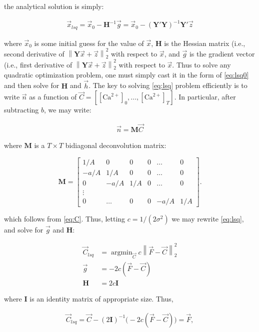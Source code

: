 \documentclass[12pt]{article}
\providecommand{\ve}[1]{\vec{#1}}
\providecommand{\ma}[1]{\boldsymbol{#1}}
\providecommand{\norm}[1]{\left \lVert#1 \right  \rVert}
\providecommand{\ve}[1]{\boldsymbol{#1}}
\DeclareMathOperator*{\argmin}{argmin}
\newcommand{\Ca}{[\text{Ca}^{2+}]}
\newcommand{\Cav}{\ve{C}}%
\begin{document}
\noindent the analytical solution is simply:

\begin{align}
\ve{x}_{lsq} = \ve{x}_0-\ma{H}^{-1}\ve{g}
= \ve{x}_0 - (\ma{Y}'\ma{Y})^{-1} \ma{Y}'\ve{z}
\end{align}

\noindent where $\ve{x}_0$ is some initial guess for the value of $\ve{x}$, $\ma{H}$ is the Hessian matrix (i.e., second derivative of $\norm{\ma{Y} \ve{x} + \ve{z}}_2^2$ with respect to $\ve{x}$, and $\ve{g}$ is the gradient vector (i.e., first  derivative of $\norm{\ma{Y} \ve{x} + \ve{z}}_2^2$ with respect to $\ve{x}$. Thus to solve any quadratic optimization problem, one must simply cast it in the form of \eqref{eq:lsq0} and then solve for $\ma{H}$ and $\ve{h}$. The key to solving \eqref{eq:lsq} problem efficiently is to write $\ve{n}$ as a function of $\Cav=[\Ca_0,\ldots,\Ca_T]$. In particular, after subtracting $b$, we may write:

\begin{align} \label{eq:nMC}
\ve{n}=\ma{M}\Cav
\end{align}

\noindent where $\ma{M}$ is a $T \times T$ bidiagonal deconvolution matrix:

\begin{equation} \label{eq:M}
\ma{M}=\begin{bmatrix}
1/A&0&0&0&\ldots&0\\
-a/A&1/A&0&0&\ldots&0\\
0&-a/A&1/A&0&\ldots&0\\
\vdots\\
0&\ldots&0&0&-a/A&1/A
\end{bmatrix}.
\end{equation}

\noindent which follows from \eqref{eq:C}. Thus, letting $c=1/(2\sigma^2)$ we may rewrite \eqref{eq:lsq}, and solve for $\ve{g}$ and $\ma{H}$:

\begin{align}
\Cav_{lsq} &= \argmin_{\Cav} c\norm{\ve{F}-\Cav}_2^2\\
\ve{g} &= -2c(\ve{F}-\Cav)\\
\ma{H}&= 2c\ma{I}
\end{align}

\noindent where $\ma{I}$ is an identity matrix of appropriate size.  Thus,

\begin{align}
\Cav_{lsq} = \Cav-(2\ma{I})^{-1} \big(-2c(\ve{F}-\Cav)\big)=\ve{F},
\end{align}
\end{document}
